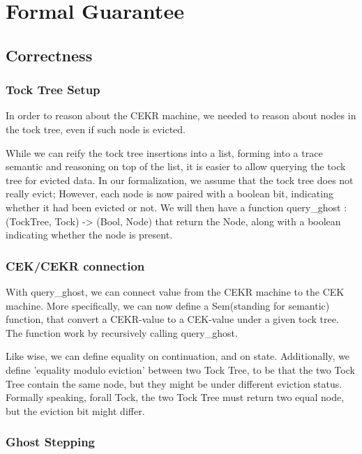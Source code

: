 \section{Formal Guarantee}
\subsection{Correctness}
\subsubsection{Tock Tree Setup}
In order to reason about the CEKR machine, we needed to reason about nodes in the tock tree, even if such node is evicted.

While we can reify the tock tree insertions into a list, forming into a trace semantic and reasoning on top of the list, it is easier to allow querying the tock tree for evicted data. In our formalization, we assume that the tock tree does not really evict; However, each node is now paired with a boolean bit, indicating whether it had been evicted or not. We will then have a function query\_ghost : (TockTree, Tock) -> (Bool, Node) that return the Node, along with a boolean indicating whether the node is present.

\subsubsection{CEK/CEKR connection}
With query\_ghost, we can connect value from the CEKR machine to the CEK machine. More specifically, we can now define a Sem(standing for semantic) function, that convert a CEKR-value to a CEK-value under a given tock tree. The function work by recursively calling query\_ghost.


Like wise, we can define equality on continuation, and on state. Additionally, we define 'equality modulo eviction' between two Tock Tree, to be that the two Tock Tree contain the same node, but they might be under different eviction status. Formally speaking, forall Tock, the two Tock Tree must return two equal node, but the eviction bit might differ.

\subsubsection{Ghost Stepping}

